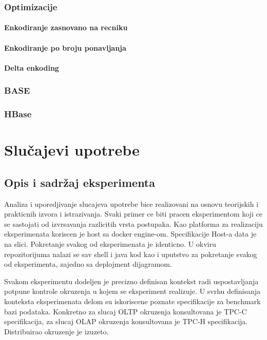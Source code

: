 \documentclass[12pt,oneside]{memoir}
\begin{document}
\subsection{Optimizacije}
\subsubsection{Enkodiranje zasnovano na recniku}
\subsubsection{Enkodiranje po broju ponavljanja}
\subsubsection{Delta enkoding}
\subsection{BASE}
\subsection{HBase}

\chapter{Slučajevi upotrebe}
\section{Opis i sadržaj eksperimenta}
Analiza i uporedjivanje slucajeva upotrebe bice realizovani na osnovu teorijskih i prakticnih  izvora i istrazivanja. Svaki primer ce biti pracen eksperimentom koji ce se sastojati od izvrsavanja razlicitih vrsta postupaka. Kao platforma za realizaciju eksperimenata koriscen je host sa docker engine-om. Specifikacije Host-a data je na slici. Pokretanje svakog od eksperimenata je identicno. U okviru repozitorijuma nalazi se sav shell i java kod kao i uputstvo za pokretanje svakog od eksperimenta, zajedno sa deplojment dijagramom.

Svakom eksperimentu dodeljen je precizno definisan kontekst radi uspostavljanja potpune kontrole okruzenja u kojem se eksperiment realizuje. U svrhu definisanja konteksta eksperimenata delom su iskoriscene poznate specifikacije za benchmark bazi podataka. Konkretno za slucaj OLTP okruzenja konsultovana je TPC-C specifikacija, za slucaj OLAP okruzenja konsultovana je TPC-H specifikacija. Distribuirao okruzenje je izuzeto.
\end{document}
